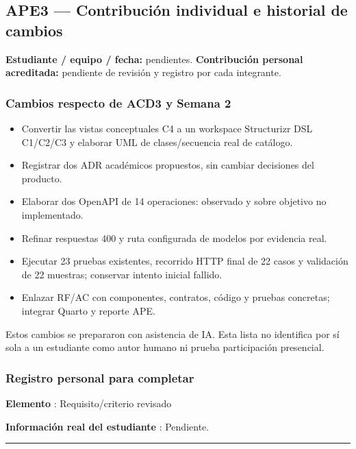 \documentclass[11pt,a4paper]{article}
\providecommand{\tightlist}{\setlength{\itemsep}{0pt}\setlength{\parskip}{0pt}}
\begin{document}
\subsection{APE3 --- Contribución individual e historial de
cambios}\label{individual-ape3--contribuciuxf3n-individual-e-historial-de-cambios}

\textbf{Estudiante / equipo / fecha:} pendientes. \textbf{Contribución
personal acreditada:} pendiente de revisión y registro por cada
integrante.

\subsubsection{Cambios respecto de ACD3 y Semana
2}\label{individual-cambios-respecto-de-acd3-y-semana-2}

\begin{itemize}
\tightlist
\item
  Convertir las vistas conceptuales C4 a un workspace Structurizr DSL
  C1/C2/C3 y elaborar UML de clases/secuencia real de catálogo.
\item
  Registrar dos ADR académicos propuestos, sin cambiar decisiones del
  producto.
\item
  Elaborar dos OpenAPI de 14 operaciones: observado y sobre objetivo no
  implementado.
\item
  Refinar respuestas 400 y ruta configurada de modelos por evidencia
  real.
\item
  Ejecutar 23 pruebas existentes, recorrido HTTP final de 22 casos y
  validación de 22 muestras; conservar intento inicial fallido.
\item
  Enlazar RF/AC con componentes, contratos, código y pruebas concretas;
  integrar Quarto y reporte APE.
\end{itemize}

Estos cambios se prepararon con asistencia de IA. Esta lista no
identifica por sí sola a un estudiante como autor humano ni prueba
participación presencial.

\subsubsection{Registro personal para
completar}\label{individual-registro-personal-para-completar}

\textbf{Elemento }: Requisito/criterio revisado

\textbf{Información real del estudiante }: Pendiente.

\medskip\hrule\medskip
\end{document}
